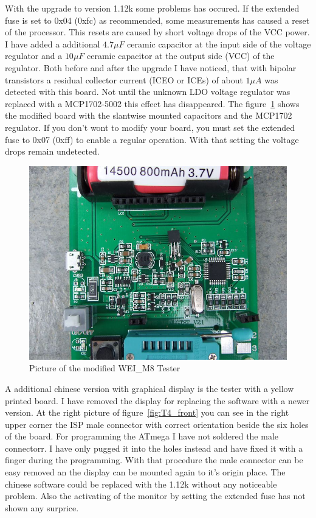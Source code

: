 With the upgrade to version 1.12k some problems has occured.
If the extended fuse is set to 0x04 (0xfc) as recommended, some measurements has
caused a  reset of the processor.
This resets are caused by short voltage drops of the VCC power.
I have added a additional \(4.7\mu F\) ceramic capacitor at the input side of
the voltage regulator and a \(10\mu F\) ceramic capacitor at the output side (VCC)
of the regulator.
Both before and after the upgrade I have noticed, that with bipolar transistors
a residual collector current (ICEO or ICEs) of about \(1\mu A\) was detected with this board.
Not until the unknown LDO voltage regulator was replaced with a MCP1702-5002 this
effect has disappeared. The figure~\ref{fig:WeiM8mod} shows the modified board with
the slantwise mounted capacitors and the MCP1702 regulator.
If you don't wont to modify your board, you must set the extended fuse to 0x07 (0xff)
to enable a regular operation. With that setting the voltage drops remain undetected.

\begin{figure}[H]
\centering
\includegraphics[width=.698\textwidth]{../PNG/WEI_M8_modified.JPG}
\caption{Picture of the modified WEI\_M8 Tester}
\label{fig:WeiM8mod}
\end{figure}

A additional chinese version with graphical display is the  tester with a yellow 
printed board.
I have removed the display for replacing the software with a newer version.
At the right picture of figure~\ref{fig:T4_front} you can see in the right upper corner the ISP male connector
with correct orientation beside the six holes of the board.
For programming the ATmega I have not soldered the male connectorr. I have only pugged it into
the holes instead and have fixed it with a finger during the programming.
With that procedure the male connector can be easy removed an the display can be mounted again to
it's origin place.
The chinese software could be replaced with the 1.12k without any noticeable problem. 
Also the activating of the  monitor by setting the extended fuse has not
shown any surprice.


